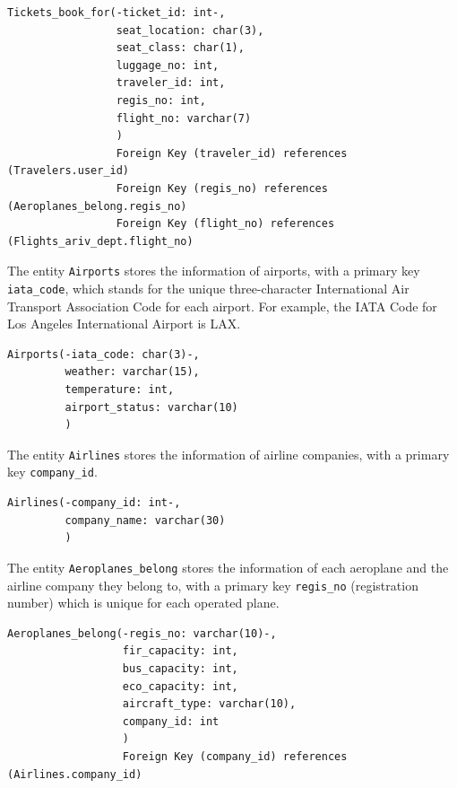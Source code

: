\documentclass{article}
\begin{document}
	\begin{lstlisting}[keepspaces=true]
Tickets_book_for(-ticket_id: int-, 
                 seat_location: char(3),
                 seat_class: char(1),
                 luggage_no: int, 
                 traveler_id: int, 
                 regis_no: int,
                 flight_no: varchar(7)
                 )
                 Foreign Key (traveler_id) references (Travelers.user_id)
                 Foreign Key (regis_no) references (Aeroplanes_belong.regis_no)
                 Foreign Key (flight_no) references (Flights_ariv_dept.flight_no)
	\end{lstlisting} 

	\noindent The entity \texttt{Airports} stores the information of airports, with a primary key \texttt{iata\_code}, which stands for the unique  three-character International Air Transport Association Code for each airport. For example, the IATA Code for Los Angeles International Airport is LAX.
	
	\begin{lstlisting}[keepspaces=true]
Airports(-iata_code: char(3)-, 
         weather: varchar(15),
         temperature: int,
         airport_status: varchar(10)
         )
	\end{lstlisting}

	\noindent The entity \texttt{Airlines} stores the information of airline companies, with a primary key \texttt{company\_id}.
	
	\begin{lstlisting}[keepspaces=true]             
Airlines(-company_id: int-,
         company_name: varchar(30)
         )
	\end{lstlisting}    

	\noindent The entity \texttt{Aeroplanes\_belong} stores the information of each aeroplane and the airline company they belong to, with a primary key \texttt{regis\_no} (registration number) which is unique for each operated plane. 
	
	\begin{lstlisting}[keepspaces=true]               
Aeroplanes_belong(-regis_no: varchar(10)-,
                  fir_capacity: int,
                  bus_capacity: int, 
                  eco_capacity: int,
                  aircraft_type: varchar(10), 
                  company_id: int
                  )
                  Foreign Key (company_id) references (Airlines.company_id)
	\end{lstlisting}    
	
\end{document}
